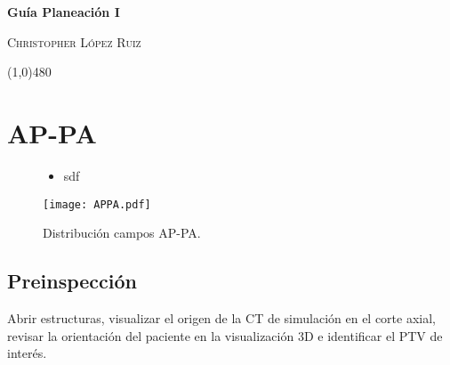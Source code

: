 \documentclass{article}
\begin{document}
\centerline{\Large \textbf{\textcolor{Grayo}{Guía Planeación I}}}
\vspace{2mm}
\centerline{\large \textsc{Christopher López Ruiz}}

\vspace{-10pt}

\begin{center}
\line(1,0){480}
\end{center}



\vspace{3pt}
%

\section*{AP-PA}

\begin{figure}[!h]
    \centering
    \begin{minipage}[t]{0.5\linewidth}
        \centering
        \begin{tcolorbox}[colback=gray!25!white, colframe=gray, title=\textbf{Resumen}, center title]
            \begin{itemize}
                \item sdf
            \end{itemize}
        \end{tcolorbox}
    \end{minipage}%
    \hfill
    \begin{minipage}[t]{0.5\linewidth}
        \centering
        \texttt{[image: APPA.pdf]}
        \caption{Distribución campos AP-PA.}
        \label{APPA}
    \end{minipage}
\end{figure}

\subsection*{Preinspección}

Abrir estructuras, visualizar el origen de la CT de simulación en el corte axial, revisar la orientación del paciente en la visualización 3D e identificar el PTV de interés.
\end{document}
